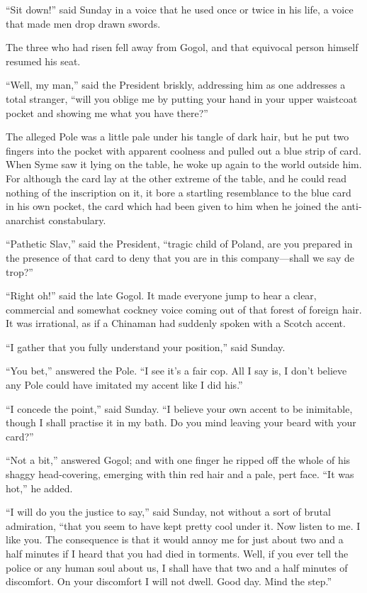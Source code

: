 “Sit down!” said Sunday in a voice that he used once or twice in his life, a voice that made men drop drawn swords.

The three who had risen fell away from Gogol, and that equivocal person himself resumed his seat.

“Well, my man,” said the President briskly, addressing him as one addresses a total stranger, “will you oblige me by putting your hand in your upper waistcoat pocket and showing me what you have there?”

The alleged Pole was a little pale under his tangle of dark hair, but he put two fingers into the pocket with apparent coolness and pulled out a blue strip of card. When Syme saw it lying on the table, he woke up again to the world outside him. For although the card lay at the other extreme of the table, and he could read nothing of the inscription on it, it bore a startling resemblance to the blue card in his own pocket, the card which had been given to him when he joined the anti-anarchist constabulary.

“Pathetic Slav,” said the President, “tragic child of Poland, are you prepared in the presence of that card to deny that you are in this company⁠—shall we say de trop?”

“Right oh!” said the late Gogol. It made everyone jump to hear a clear, commercial and somewhat cockney voice coming out of that forest of foreign hair. It was irrational, as if a Chinaman had suddenly spoken with a Scotch accent.

“I gather that you fully understand your position,” said Sunday.

“You bet,” answered the Pole. “I see it’s a fair cop. All I say is, I don’t believe any Pole could have imitated my accent like I did his.”

“I concede the point,” said Sunday. “I believe your own accent to be inimitable, though I shall practise it in my bath. Do you mind leaving your beard with your card?”

“Not a bit,” answered Gogol; and with one finger he ripped off the whole of his shaggy head-covering, emerging with thin red hair and a pale, pert face. “It was hot,” he added.

“I will do you the justice to say,” said Sunday, not without a sort of brutal admiration, “that you seem to have kept pretty cool under it. Now listen to me. I like you. The consequence is that it would annoy me for just about two and a half minutes if I heard that you had died in torments. Well, if you ever tell the police or any human soul about us, I shall have that two and a half minutes of discomfort. On your discomfort I will not dwell. Good day. Mind the step.”

